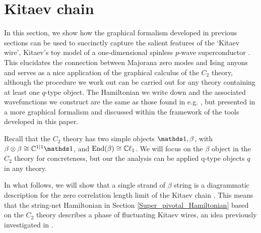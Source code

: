 
\section{Kitaev chain} \label{kitaev_wire}

In this section, we show how the graphical formalism developed in previous sections
can be used to succinctly capture the salient features of the `Kitaev wire', 
Kitaev's toy model of a one-dimensional spinless $p$-wave superconductor \cite{kitaev2001}. 
This elucidates the connection between Majorana zero modes and Ising anyons and serves 
as a nice application of the graphical calculus of the $C_2$ theory, although the procedure we work 
out can be carried out for any theory containing at least one $q$-type object.
The Hamiltonian we write down and the associated wavefunctions we construct are 
the same as those found in e.g. \cite{fidkowski2011}, but presented in a more graphical formalism and 
discussed within the framework of the tools developed in this paper. 

Recall that the $C_2$ theory has two simple objects $\unit,\beta$,
with $\beta\tp \beta\cong \cc^{1|1}\unit$,
and $\text{End}(\beta) \cong \mathbb{C}\ell_1$.
We will focus on the $\beta$ object in the $C_2$ 
theory for concreteness, but our the analysis can be applied q-type objects $q$ in any theory.

In what follows, 
we will show that a single strand of $\beta$ string is a diagrammatic description for the zero correlation length limit of the Kitaev chain .
This means that the string-net Hamiltonian in Section \ref{Super_pivotal_Hamiltonian} 
based on the $C_2$ theory describes a phase of fluctuating Kitaev wires, 
an idea previously investigated in \cite{tarantino2016,ware2016,kapustin2017}.

